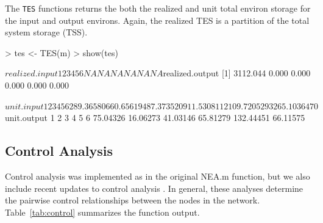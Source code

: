 \documentclass[article]{jss}
\begin{document}
The \texttt{TES} functions returns the both the realized and unit
total environ storage for the input and output environs.  Again, the
realized TES is a partition of the total system storage (TSS).

\begin{Schunk}
\begin{Sinput}
> tes <- TES(m)
> show(tes)
\end{Sinput}
\begin{Soutput}
$realized.input
 1  2  3  4  5  6 
NA NA NA NA NA NA 

$realized.output
[1] 3112.044    0.000    0.000    0.000    0.000    0.000

$unit.input
          1           2           3           4           5           6 
289.3658066   0.6561948   7.3735209  11.5308112 109.7205293 265.1036470 

$unit.output
        1         2         3         4         5         6 
 75.04326  16.06273  41.03146  65.81279 132.44451  66.11575 
\end{Soutput}
\end{Schunk}

\subsection{Control Analysis}



Control analysis was implemented as in the original NEA.m function,
but we also include recent updates to control analysis
\citep[e.g.,][]{schramski06, schramski07}.  In general, these analyses
determine the pairwise control relationships between the nodes in the
network.  Table~\ref{tab:control} summarizes the function output.
\end{document}
